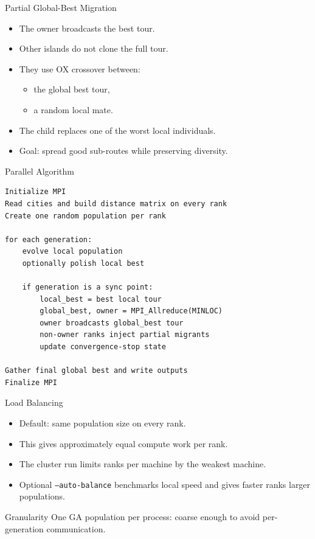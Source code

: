 \documentclass[aspectratio=169]{beamer}
\begin{document}
\begin{frame}{Partial Global-Best Migration}
  \begin{itemize}
    \item The owner broadcasts the best tour.
    \item Other islands do not clone the full tour.
    \item They use OX crossover between:
      \begin{itemize}
        \item the global best tour,
        \item a random local mate.
      \end{itemize}
    \item The child replaces one of the worst local individuals.
    \item Goal: spread good sub-routes while preserving diversity.
  \end{itemize}
\end{frame}

\begin{frame}{Parallel Algorithm}
\begin{lstlisting}
Initialize MPI
Read cities and build distance matrix on every rank
Create one random population per rank

for each generation:
    evolve local population
    optionally polish local best

    if generation is a sync point:
        local_best = best local tour
        global_best, owner = MPI_Allreduce(MINLOC)
        owner broadcasts global_best tour
        non-owner ranks inject partial migrants
        update convergence-stop state

Gather final global best and write outputs
Finalize MPI
\end{lstlisting}
\end{frame}

\begin{frame}{Load Balancing}
  \begin{itemize}
    \item Default: same population size on every rank.
    \item This gives approximately equal compute work per rank.
    \item The cluster run limits ranks per machine by the weakest machine.
    \item Optional \texttt{--auto-balance} benchmarks local speed and gives faster ranks larger populations.
  \end{itemize}
  \begin{block}{Granularity}
    One GA population per process: coarse enough to avoid per-generation communication.
  \end{block}
\end{frame}
\end{document}
